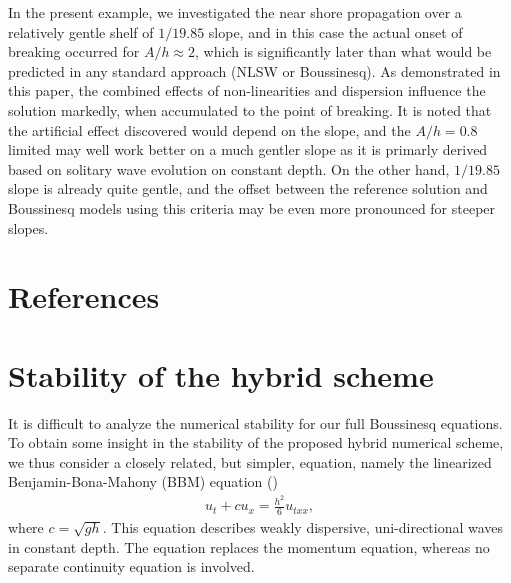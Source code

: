 \documentclass[review]{elsarticle}
\begin{document}
In the present example, we investigated the near shore propagation over a relatively gentle shelf of $1/19.85$ slope,
and in this case the actual onset of breaking occurred for $A/h \approx 2$, which is significantly later
than what would be predicted in any standard approach (NLSW or Boussinesq). As demonstrated in this paper,
the combined effects of non-linearities and dispersion influence the solution markedly, when accumulated to the point
of breaking. It is noted that the artificial effect discovered would depend on the slope, 
and the $A/h=0.8$ limited may well work better on a much gentler slope as it is primarly derived based on 
solitary wave evolution on constant depth. On the other hand, $1/19.85$ slope is already quite gentle,
and the offset between the reference solution and Boussinesq models using this criteria may
be even more pronounced for steeper slopes.


\section*{References}



\appendix

\section{Stability of the hybrid scheme}
\label{append:stab}
It is difficult to analyze the numerical stability for  our full Boussinesq
equations. 
To obtain some insight in the  stability of the proposed hybrid numerical scheme,
we thus consider a closely related, but simpler, equation, namely the 
linearized Benjamin-Bona-Mahony (BBM)
equation (\cite{benjamin1972model}) 
\begin{align}
u_t + c u_x = \frac{h^2}{6}u_{txx},
\label{eq:basic_1}
\end{align}
where $c=\sqrt{gh}$.
This equation describes weakly dispersive, uni-directional waves in constant
depth. The equation replaces the momentum equation, whereas no separate
continuity equation is involved.
\end{document}
